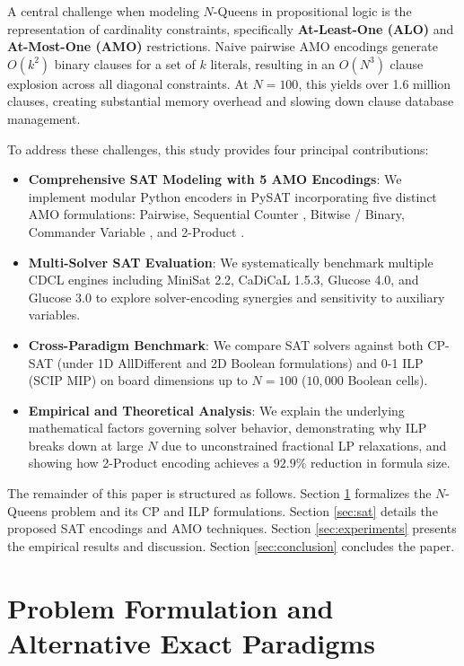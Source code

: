 \documentclass[a4paper,fleqn]{cas-sc}
\begin{document}
A central challenge when modeling $N$-Queens in propositional logic is the representation of cardinality constraints, specifically \textbf{At-Least-One (ALO)} and \textbf{At-Most-One (AMO)} restrictions. Naive pairwise AMO encodings generate $O(k^2)$ binary clauses for a set of $k$ literals, resulting in an $O(N^3)$ clause explosion across all diagonal constraints. At $N = 100$, this yields over 1.6 million clauses, creating substantial memory overhead and slowing down clause database management.

To address these challenges, this study provides four principal contributions:
\begin{itemize}
    \item \textbf{Comprehensive SAT Modeling with 5 AMO Encodings}: We implement modular Python encoders in PySAT \citep{ignatiev2018pysat} incorporating five distinct AMO formulations: Pairwise, Sequential Counter \citep{sinz2005towards}, Bitwise / Binary, Commander Variable \citep{klieber2007commander}, and 2-Product \citep{chen2010two}.
    \item \textbf{Multi-Solver SAT Evaluation}: We systematically benchmark multiple CDCL engines including MiniSat 2.2, CaDiCaL 1.5.3, Glucose 4.0, and Glucose 3.0 to explore solver-encoding synergies and sensitivity to auxiliary variables.
    \item \textbf{Cross-Paradigm Benchmark}: We compare SAT solvers against both CP-SAT (under 1D AllDifferent and 2D Boolean formulations) and 0-1 ILP (SCIP MIP) on board dimensions up to $N = 100$ ($10,000$ Boolean cells).
    \item \textbf{Empirical and Theoretical Analysis}: We explain the underlying mathematical factors governing solver behavior, demonstrating why ILP breaks down at large $N$ due to unconstrained fractional LP relaxations, and showing how 2-Product encoding achieves a $92.9\%$ reduction in formula size.
\end{itemize}

The remainder of this paper is structured as follows. Section \ref{sec:problem} formalizes the $N$-Queens problem and its CP and ILP formulations. Section \ref{sec:sat} details the proposed SAT encodings and AMO techniques. Section \ref{sec:experiments} presents the empirical results and discussion. Section \ref{sec:conclusion} concludes the paper.

\section{Problem Formulation and Alternative Exact Paradigms}
\label{sec:problem}
\end{document}
